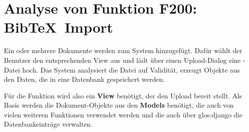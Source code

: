 \section{Analyse von Funktion F200: Bib\TeX\ Import}
Ein oder mehrere Dokumente werden zum System hinzugefügt. Dafür wählt der
Benutzer den entsprechenden View aus und lädt über einen Upload-Dialog eine
\BibTeX -Datei hoch. Das System analysiert die Datei auf Validität, erzeugt
Objekte aus den Daten, die in eine Datenbank gespeichert werden.

Für die Funktion wird also ein \textbf{View} benötigt, der den Upload bereit
stellt.  Als Basis werden die Dokument-Objekte aus den \textbf{Models} benötigt,
die auch von vielen weiteren Funktionen verwendet werden und die auch über
\gls{glos:django} die Datenbankeinträge verwalten.
